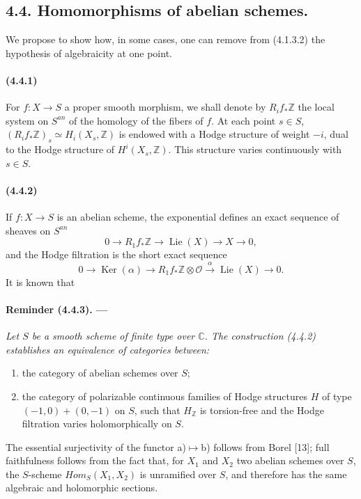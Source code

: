 \documentclass[10pt]{article}
\newcommand{\C}{\mathbb C}
\newcommand{\Z}{\mathbb Z}
\newcommand{\Ker}{\operatorname{Ker}}
\providecommand{\Lie}{\operatorname{Lie}}
\providecommand{\cO}{\mathcal O}
\providecommand{\cO}{\mathcal O}
\begin{document}
\subsection*{4.4. Homomorphisms of abelian schemes.}

We propose to show how, in some cases, one can remove from (4.1.3.2) the hypothesis of algebraicity at one point.

\paragraph{(4.4.1)} For $f:X\to S$ a proper smooth morphism, we shall denote by $R_if_*\Z$ the local system on $S^{an}$ of the homology of the fibers of $f$. At each point $s\in S$, $(R_if_*\Z)_s\simeq H_i(X_s,\Z)$ is endowed with a Hodge structure of weight $-i$, dual to the Hodge structure of $H^i(X_s,\Z)$. This structure varies continuously with $s\in S$.

\paragraph{(4.4.2)} If $f:X\to S$ is an abelian scheme, the exponential defines an exact sequence of sheaves on $S^{an}$
\[
0\to R_1f_*\Z\to\Lie(X)\to X\to0,
\]
and the Hodge filtration is the short exact sequence
\[
0\to\Ker(\alpha)\to R_1f_*\Z\otimes\cO\xrightarrow{\alpha}\Lie(X)\to0.
\]
It is known that

\paragraph{Reminder (4.4.3). ---} {\itshape Let $S$ be a smooth scheme of finite type over $\C$. The construction (4.4.2) establishes an equivalence of categories between:
\begin{enumerate}[label=\alph*)]
\item the category of abelian schemes over $S$;
\item the category of polarizable continuous families of Hodge structures $H$ of type $(-1,0)+(0,-1)$ on $S$, such that $H_\Z$ is torsion-free and the Hodge filtration varies holomorphically on $S$.
\end{enumerate}}
The essential surjectivity of the functor a)$\mapsto$b) follows from Borel [13]; full faithfulness follows from the fact that, for $X_1$ and $X_2$ two abelian schemes over $S$, the $S$-scheme $\mathit{Hom}_S(X_1,X_2)$ is unramified over $S$, and therefore has the same algebraic and holomorphic sections.
\end{document}
